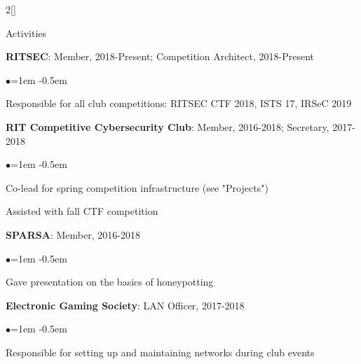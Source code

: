 \documentclass[8pt]{resume} %
\begin{document}
\begin{multicols}{2}[]
\columnbreak


\begin{rSection}{Activities}

    {\bf RITSEC}: Member, 2018-Present; Competition Architect, 2018-Present
    \begin{list}{$\bullet$}{\leftmargin=1em}
    \itemsep -0.5em \vspace{-0.5em}
    \item Responsible for all club competitions: RITSEC CTF 2018, ISTS 17,
        IRSeC 2019
    \end{list}

    {\bf RIT Competitive Cybersecurity Club}: Member, 2016-2018; Secretary,
    2017-2018
    \begin{list}{$\bullet$}{\leftmargin=1em}
    \itemsep -0.5em \vspace{-0.5em}
    \item Co-lead for spring competition infrastructure (see "Projects")
    \item Assisted with fall CTF competition
    \end{list}

    {\bf SPARSA}: Member, 2016-2018
    \begin{list}{$\bullet$}{\leftmargin=1em}
    \itemsep -0.5em \vspace{-0.5em}
    \item Gave presentation on the basics of honeypotting
    \end{list}

    {\bf Electronic Gaming Society}: LAN Officer, 2017-2018
    \begin{list}{$\bullet$}{\leftmargin=1em}
    \itemsep -0.5em \vspace{-0.5em}
    \item Responsible for setting up and maintaining networks during club
        events
    \end{list}

\end{rSection}


\end{multicols}
\end{document}
